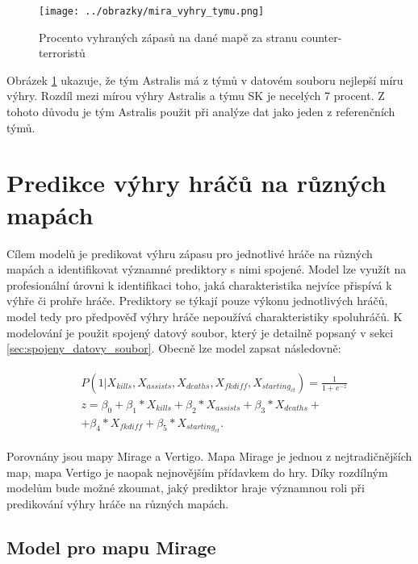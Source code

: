 \begin{figure}[H]
    \centering
    \texttt{[image: ../obrazky/mira\_vyhry\_tymu.png]}
    \caption{Procento vyhraných zápasů na dané mapě za stranu counter-terroristů} 
    \label{fig:mira_vyhry_tymu}
\end{figure}

Obrázek \ref{fig:mira_vyhry_tymu} ukazuje, že tým Astralis má z týmů v datovém souboru nejlepší míru výhry. Rozdíl mezi mírou výhry Astralis a týmu SK je necelých 7 procent.
Z tohoto důvodu je tým Astralis použit při analýze dat jako jeden z referenčních týmů.

\newpage
\section{Predikce výhry hráčů na různých mapách}
Cílem modelů je predikovat výhru zápasu pro jednotlivé hráče na různých mapách a identifikovat významné prediktory s nimi spojené. Model lze využít na profesionální
úrovni k identifikaci toho, jaká charakteristika nejvíce přispívá k výhře či prohře hráče. Prediktory se týkají pouze výkonu jednotlivých
hráčů, model tedy pro předpověď výhry hráče nepoužívá charakteristiky spoluhráčů. K modelování je použit spojený datový soubor, který je detailně popsaný v
sekci \ref{sec:spojeny_datovy_soubor}. Obecně lze model zapsat následovně:

\begin{align}
    \begin{split}
        &P(1 | X_{kills}, X_{assists}, X_{deaths}, X_{fkdiff}, X_{starting_{ct}}) = \frac{1}{1 + e^{-z}} \\
        &z = \beta_0 + \beta_1*X_{kills} + \beta_2*X_{assists} + \beta_3*X_{deaths} + \\
        &+ \beta_4*X_{fkdiff} + \beta_5*X_{starting_{ct}}.
    \end{split}
\end{align}

Porovnány jsou mapy Mirage a Vertigo. Mapa Mirage je jednou z nejtradičnějších map, mapa Vertigo je naopak nejnovějším přídavkem do hry.
Díky rozdílným modelům bude možné zkoumat, jaký prediktor hraje významnou roli při predikování výhry hráče na různých mapách.

\subsection{Model pro mapu Mirage}



